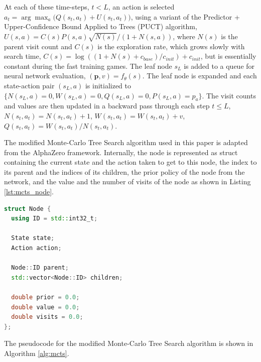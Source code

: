 At each of these time-steps, $t < L$, an action is selected $a_t = \operatorname{arg} \operatorname{max}_a \big(Q(s_t, a_t) + U(s_t, a_t)\big)$, using a variant of the Predictor + Upper-Confidence Bound Applied to Trees (PUCT) algorithm, $U(s, a) =  C(s) P(s, a) \sqrt{N(s)} / (1 + N(s, a))$, where $N(s)$ is the parent visit count and $C(s)$ is the exploration rate, which grows slowly with search time, $C(s) = \log\left((1 + N(s) + c_{base}) / c_{init}\right) + c_{init}$, but is essentially constant during the fast training games. The leaf node $s_L$ is added to a queue for neural network evaluation, $(\mathbf{p}, v) = f_\theta(s)$. The leaf node is expanded and each state-action pair $(s_L, a)$ is initialized to $\{N(s_L, a) = 0, W(s_L, a) = 0, Q(s_L, a) = 0, P(s_L, a) = p_a\}$. The visit counts and values are then updated in a backward pass through each step $t \leq L$, $N(s_t, a_t) = N(s_t, a_t) + 1$, $W(s_t, a_t) = W(s_t, a_t) + v$, $Q(s_t, a_t) = W(s_t,a_t) / N(s_t,a_t)$.

The modified Monte-Carlo Tree Search algorithm used in this paper is adapted from the AlphaZero framework. Internally, the node is represented as struct containing the current state and the action taken to get to this node, the index to its parent and the indices of its children, the prior policy of the node from the network, and the value and the number of visits of the node as shown in Listing \ref{lst:mcts_node}.

\begin{lstlisting}[language=C++,captionpos=b,label={lst:mcts_node},caption={Node Representation for the Monte-Carlo Tree Search Algorithm}]
struct Node {
  using ID = std::int32_t;

  State state;
  Action action;

  Node::ID parent;
  std::vector<Node::ID> children;

  double prior = 0.0;
  double value = 0.0;
  double visits = 0.0;
};
\end{lstlisting}

The pseudocode for the modified Monte-Carlo Tree Search algorithm is shown in Algorithm \ref{alg:mcts}.

